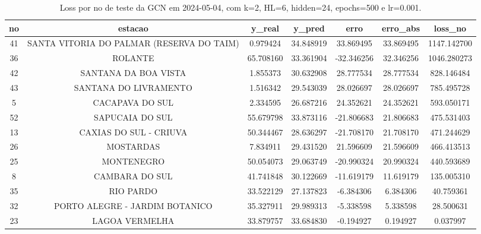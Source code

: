 \begin{table}[h]
\centering
\caption{Loss por no de teste da GCN em 2024-05-04, com k=2, HL=6, hidden=24, epochs=500 e lr=0.001.}
\label{tab:gcn_loss_k2_hl6_h24_e500_d20240504}
\begin{tabular}{ccccccc}
\toprule
no & estacao & y\_real & y\_pred & erro & erro\_abs & loss\_no \\
\midrule
41 & SANTA VITORIA DO PALMAR (RESERVA DO TAIM) & 0.979424 & 34.848919 & 33.869495 & 33.869495 & 1147.142700 \\
36 & ROLANTE & 65.708160 & 33.361904 & -32.346256 & 32.346256 & 1046.280273 \\
42 & SANTANA DA BOA VISTA & 1.855373 & 30.632908 & 28.777534 & 28.777534 & 828.146484 \\
43 & SANTANA DO LIVRAMENTO & 1.516342 & 29.543039 & 28.026697 & 28.026697 & 785.495728 \\
5 & CACAPAVA DO SUL & 2.334595 & 26.687216 & 24.352621 & 24.352621 & 593.050171 \\
52 & SAPUCAIA DO SUL & 55.679798 & 33.873116 & -21.806683 & 21.806683 & 475.531403 \\
13 & CAXIAS DO SUL - CRIUVA & 50.344467 & 28.636297 & -21.708170 & 21.708170 & 471.244629 \\
26 & MOSTARDAS & 7.834911 & 29.431520 & 21.596609 & 21.596609 & 466.413513 \\
25 & MONTENEGRO & 50.054073 & 29.063749 & -20.990324 & 20.990324 & 440.593689 \\
8 & CAMBARA DO SUL & 41.741848 & 30.122669 & -11.619179 & 11.619179 & 135.005310 \\
35 & RIO PARDO & 33.522129 & 27.137823 & -6.384306 & 6.384306 & 40.759361 \\
32 & PORTO ALEGRE - JARDIM BOTANICO & 35.327911 & 29.989313 & -5.338598 & 5.338598 & 28.500631 \\
23 & LAGOA VERMELHA & 33.879757 & 33.684830 & -0.194927 & 0.194927 & 0.037997 \\
\bottomrule
\end{tabular}
\end{table}

